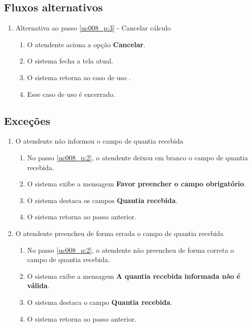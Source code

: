 \subsection{Fluxos alternativos}

\begin{enumerate}[label=A\arabic*]
	\item Alternativa ao passo \ref{uc008_p:3} - Cancelar cálculo \label{uc008_a:1}
	\begin{enumerate}[label*=.\arabic*]
		\item O atendente aciona a opção \textbf{Cancelar}.
		\item O sistema fecha a tela atual.
		\item O sistema retorna ao caso de uso .
		\item Esse caso de uso é encerrado.
	\end{enumerate} 	
\end{enumerate}

\subsection{Exceções}

\begin{enumerate}[label=E\arabic*]
	\item O atendente não informou o campo de quantia recebida \label{uc008_e:1}
	\begin{enumerate}[label*=.\arabic*]
		\item[] No passo \ref{uc008_p:2}, o atendente deixou em branco o campo de quantia recebida.
		\item O sistema exibe a mensagem \textbf{Favor preencher o campo obrigatório}.
		\item O sistema destaca os campos \textbf{Quantia recebida}.
		\item O sistema retorna ao passo anterior.
	\end{enumerate}
	
	\item O atendente preencheu de forma errada o campo de quantia recebida \label{uc008_e:2}
	\begin{enumerate}[label*=.\arabic*]		
		\item[] No passo \ref{uc008_p:2}, o atendente não preencheu de forma correta o campo de quantia recebida.		
		\item O sistema exibe a mensagem \textbf{A quantia recebida informada não é válida}.
		\item O sistema destaca o campo \textbf{Quantia recebida}.
		\item O sistema retorna ao passo anterior.
	\end{enumerate}
\end{enumerate}

